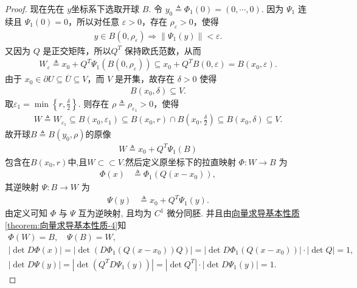 \documentclass[../../main.tex]{subfiles}
\begin{document}
\begin{proof}
现在先在 \(y\)坐标系下选取开球 \(B\). 令 \(y_0 \triangleq \Phi_1(0)=(0,\cdots,0)\). 
因为 \(\Psi_1\) 连续且 \(\Psi_1(0)=0\)，所以对任意 \(\varepsilon>0\)，存在 \(\rho_\varepsilon>0\)，使得
\begin{align*}
y\in B(0,\rho_\varepsilon)\Longrightarrow \|\Psi_1(y)\|<\varepsilon.
\end{align*}
又因为 \(Q\) 是正交矩阵，所以\(Q^T\) 保持欧氏范数，从而
\begin{align*}
W_\varepsilon\triangleq x_0+Q^T\Psi_1(B(0,\rho_\varepsilon))
\subseteq x_0+Q^TB(0,\varepsilon)
=B(x_0,\varepsilon).
\end{align*}
由于 \(x_0\in\partial U\subseteq \overline U\subseteq V\)，而 \(V\) 是开集，故存在 \(\delta>0\) 使得
\begin{align*}
B(x_0,\delta)\subseteq V.
\end{align*}
取$\varepsilon_1=\min\left\{r,\frac{\delta}{2}\right\}.$
则存在 \(\rho\triangleq \rho_{\varepsilon_1}>0\)，使得
\begin{align*}
W\triangleq W_{\varepsilon_1}\subseteq B(x_0,\varepsilon_1)\subseteq B(x_0,r)\cap B\left(x_0,\frac{\delta}{2}\right)\subseteq B(x_0,\delta)\subseteq V.
\end{align*}
故开球$B \triangleq B(y_0, \rho)$的原像
\begin{align*}
W\triangleq x_0+Q^T\Psi _1\left( B \right)
\end{align*}
包含在$B\left( x_0,r \right)$中,且$W\subset \subset V$.然后定义原坐标下的拉直映射 \(\Phi: W \to B\) 为
\begin{align*}
\Phi(x) &\triangleq \Phi_1(Q(x - x_0)),
\end{align*}
其逆映射 \(\Psi: B \to W\) 为
\begin{align*}
\Psi(y) &\triangleq x_0 + Q^T \Psi_1(y).
\end{align*}
由定义可知 \(\Phi\) 与 \(\Psi\) 互为逆映射, 且均为 \(C^1\) 微分同胚. 并且由\hyperref[theorem:向量求导基本性质]{向量求导基本性质\ref{theorem:向量求导基本性质-4}}知
\begin{gather}
\Phi(W) = B, \quad \Psi(B) = W,\label{eq::jifjiojiojiojiomfijsfiojjsifjioejiojmwfiejfiwmfiowijijwfio-1}\\
\left| \det D\Phi \left( x \right) \right|=\left| \det \left( D\Phi _1\left( Q\left( x-x_0 \right) \right) Q \right) \right|=\left| \det D\Phi _1\left( Q\left( x-x_0 \right) \right) \right|\cdot \left| \det Q \right|=1,\label{eq::jifjiojiojiojiomfijsfiojjsifjioejiojmwfiejfiwmfiowijijwfio-2}
\\
\left| \det D\Psi \left( y \right) \right|=\left| \det \left( Q^TD\Psi _1\left( y \right) \right) \right|=\left| \det Q^T \right|\cdot \left| \det D\Psi _1\left( y \right) \right|=1.\label{eq::jifjiojiojiojiomfijsfiojjsifjioejiojmwfiejfiwmfiowijijwfio-3}
\end{gather}


\end{proof}
\end{document}
